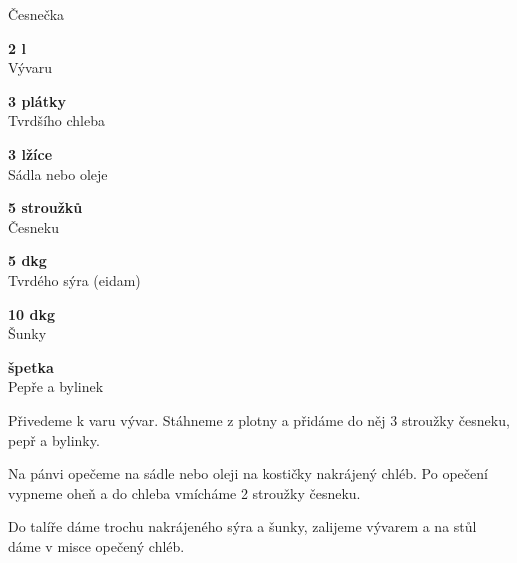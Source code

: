 \documentclass[11pt,a4paper]{article}
\begin{document}
\begin{recipe}[Fuchsia]{Česnečka}
    \begin{ingredients}
        \item \parbox[t]{\linewidth}{\raggedright \liquid \textbf{2 l}\\ Vývaru}
        \item \parbox[t]{\linewidth}{\raggedright \piece \textbf{3 plátky}\\ Tvrdšího chleba}
        \item \parbox[t]{\linewidth}{\raggedright \spoon \textbf{3 lžíce}\\ Sádla nebo oleje}
        \item \parbox[t]{\linewidth}{\raggedright \piece \textbf{5 stroužků}\\ Česneku}
        \item \parbox[t]{\linewidth}{\raggedright \weight \textbf{5 dkg}\\ Tvrdého sýra (eidam)}
        \item \parbox[t]{\linewidth}{\raggedright \weight \textbf{10 dkg}\\ Šunky}
        \item \parbox[t]{\linewidth}{\raggedright \indefinite \textbf{špetka}\\ Pepře a bylinek}
    \end{ingredients}
    \begin{steps}
        \item Přivedeme k varu vývar. Stáhneme z plotny a přidáme do něj 3 stroužky česneku, pepř a bylinky. 
        \item Na pánvi opečeme na sádle nebo oleji na kostičky nakrájený chléb. Po opečení vypneme oheň a do chleba vmícháme 2 stroužky česneku. 
        \item Do talíře dáme trochu nakrájeného sýra a šunky, zalijeme vývarem a na stůl dáme v misce opečený chléb.
    \end{steps}
\end{recipe}
\end{document}
